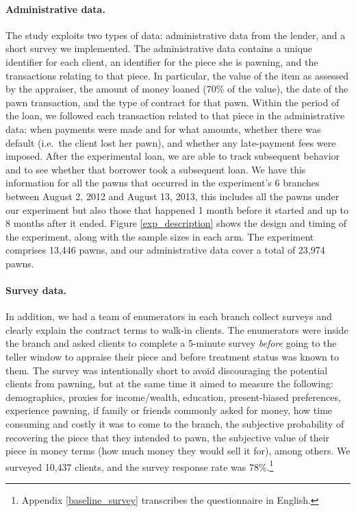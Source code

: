 \documentclass[oneside,11pt]{article}
\begin{document}
\paragraph{Administrative data.} The study exploits two types of data: administrative data from the lender, and a short survey we implemented. The administrative data contains a unique identifier for each client, an identifier for the piece she is pawning, and the transactions relating to that piece. In particular, the value of the item as assessed by the appraiser, the amount of money loaned (70\% of the value), the date of the pawn transaction, and the type of contract for that pawn. Within the period of the loan, we followed each transaction related to that piece in the administrative data: when payments were made and for what amounts, whether there was default (i.e.\ the client lost her pawn), and whether any late-payment fees were imposed. After the experimental loan, we are able to track subsequent behavior and to see whether that borrower took a subsequent loan.  We have this information for all the pawns that occurred in the experiment's 6 branches between August 2, 2012 and August 13, 2013, this includes all the pawns under our experiment but also those that happened 1 month before it started and up to 8 months after it ended. Figure \ref{exp_description} shows the design and timing of the experiment, along with the sample sizes in each arm. The experiment comprises 13,446 pawns, and our administrative data cover a total of 23,974 pawns.

\paragraph{Survey data.} In addition, we had a team of enumerators in each branch collect surveys and clearly explain the contract terms to walk-in clients. The enumerators were inside the branch and asked clients to complete a 5-minute survey \textit{before} going to the teller window to appraise their piece and before treatment status was known to them. The survey was intentionally short to avoid discouraging the potential clients from pawning, but at the same time it aimed to measure the following: demographics, proxies for income/wealth, education, present-biased preferences, experience pawning, if family or friends commonly asked for money, how time consuming and costly it was to come to the branch, the subjective probability of recovering the piece that they intended to pawn, the subjective value of their piece in money terms (how much money they would sell it for), among others. We surveyed 10,437 clients, and the survey response rate was 78\%.\footnote{Appendix \ref{baseline_survey} transcribes the questionnaire in English.} %
\end{document}
